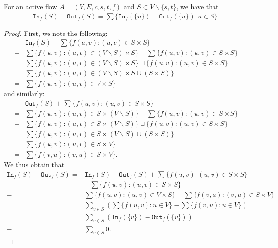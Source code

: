 \documentclass{article}
\begin{document}
\begin{lemma}\label{global_conservation_of_flow}
    For an active flow $A=(V, E, c, s, t, f)$ and $S \subset V \backslash \{s, t\}$, we have that
    \begin{align*}
        \texttt{In}_f(S)-\texttt{Out}_f(S) = \sum \{\texttt{In}_f(\{u\}) - \texttt{Out}_f(\{u\}): u \in S\}.
    \end{align*}
\end{lemma}
\begin{proof}
    First, we note the following:
    \begin{align*}
        &\texttt{In}_f(S) + \sum \{f(u, v) : (u, v) \in S \times S\}\\
        =& \sum \{f(u, v) : (u, v) \in (V \backslash S) \times S\} + \sum \{f(u, v) : (u, v) \in S \times S\}\\
        =& \sum \{f(u, v) : (u, v) \in (V \backslash S) \times S\} \sqcup \{f(u, v) : (u, v) \in S \times S\}\\
        =& \sum \{f(u, v) : (u, v) \in (V \backslash S) \times S \cup (S \times S)\}\\
        =& \sum \{f(u, v) : (u, v) \in V \times S\}
    \end{align*}
    and similarly:
    \begin{align*}
        &\texttt{Out}_f(S) + \sum \{f(u, v) : (u, v) \in S \times S\}\\
        =& \sum \{f(u, v) : (u, v) \in S \times (V \backslash S)\} + \sum \{f(u, v) : (u, v) \in S \times S\}\\
        =& \sum \{f(u, v) : (u, v) \in S \times (V \backslash S)\} \sqcup \{f(u, v) : (u, v) \in S \times S\}\\
        =& \sum \{f(u, v) : (u, v) \in S \times (V \backslash S) \cup (S \times S)\}\\
        =& \sum \{f(u, v) : (u, v) \in S \times V\}\\
        =& \sum \{f(v, u) : (v, u) \in S \times V\}.
    \end{align*}
    We thus obtain that
    \begin{align*}
        \texttt{In}_f(S)-\texttt{Out}_f(S) =& \texttt{In}_f(S)-\texttt{Out}_f(S) + \sum \{f(u, v) : (u, v) \in S \times S\}\\ &- \sum \{f(u, v) : (u, v) \in S \times S\}\\
        =& \sum \{f(u, v) : (u, v) \in V \times S\} - \sum \{f(v, u) : (v, u) \in S \times V\}\\
        =& \sum_{v \in S} \left(\sum \{f(u, v) : u \in V\} - \sum \{f(v, u) : u \in V\}\right)\\
        =& \sum_{v \in S} (\texttt{In}_f(\{v\}) - \texttt{Out}_f(\{v\}))\\
        =& \sum_{v \in S} 0.
    \end{align*}
\end{proof}
\end{document}
